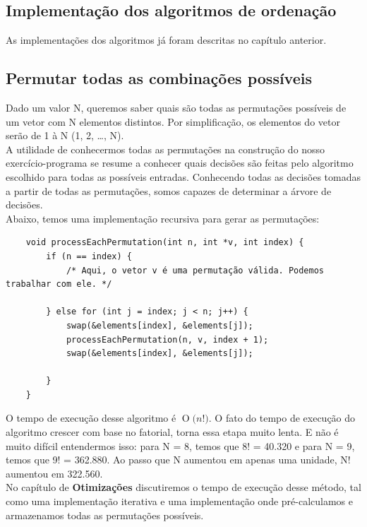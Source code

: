 \documentclass[12pt,a4paper]{article}
\newcommand{\BigO}[1]{\ensuremath{\operatorname{O}\bigl(#1\bigr)}}
\begin{document}
	\subsection{Implementação dos algoritmos de ordenação}
	\indent As implementações dos algoritmos já foram descritas no capítulo anterior.



	\subsection{Permutar todas as combinações possíveis}
	\indent Dado um valor N, queremos saber quais são todas as permutações possíveis de um vetor com N elementos distintos. Por simplificação, os elementos do vetor serão de 1 à N (1, 2, …, N).\\
	\indent A utilidade de conhecermos todas as permutações na construção do nosso exercício-programa se resume a conhecer quais decisões são feitas pelo algoritmo escolhido para todas as possíveis entradas. Conhecendo todas as decisões tomadas a partir de todas as permutações, somos capazes de determinar a árvore de decisões.\\
	\indent Abaixo, temos uma implementação recursiva para gerar as permutações:

	\begin{minipage}{\linewidth}
	\begin{lstlisting}
	void processEachPermutation(int n, int *v, int index) {
		if (n == index) {
			/* Aqui, o vetor v é uma permutação válida. Podemos trabalhar com ele. */

		} else for (int j = index; j < n; j++) {
			swap(&elements[index], &elements[j]);
			processEachPermutation(n, v, index + 1);
			swap(&elements[index], &elements[j]);

		}
	}
	\end{lstlisting}
	\end{minipage}

	\indent O tempo de execução desse algoritmo é \BigO{n!}. O fato do tempo de execução do algoritmo crescer com base no fatorial, torna essa etapa muito lenta. E não é muito difícil entendermos isso: para N = 8, temos que 8! =  40.320 e para N = 9, temos que 9! = 362.880. Ao passo que N aumentou em apenas uma unidade, N! aumentou em 322.560.\\
	\indent No capítulo de \textbf{Otimizações} discutiremos o tempo de execução desse método, tal como uma implementação iterativa e uma implementação onde pré-calculamos e armazenamos todas as permutações possíveis.
\end{document}
